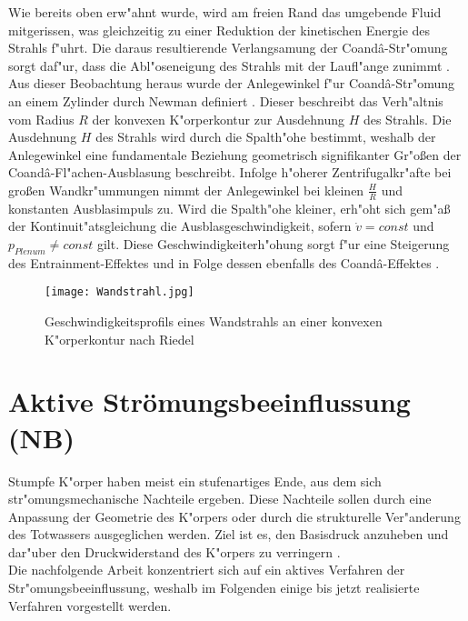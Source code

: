 Wie bereits oben erw"ahnt wurde, wird am freien Rand das umgebende Fluid mitgerissen, was gleichzeitig zu einer Reduktion der kinetischen Energie des Strahls f"uhrt. Die daraus resultierende Verlangsamung der Coand\^{a}-Str"omung sorgt daf"ur, dass die Abl"oseneigung des Strahls mit der Laufl"ange zunimmt \cite{Fischer.2011}. Aus dieser Beobachtung heraus wurde der Anlegewinkel f"ur Coand\^{a}-Str"omung an einem Zylinder durch Newman definiert \cite{Newman.1961}. Dieser beschreibt das Verh"altnis vom Radius $R$ der konvexen K"orperkontur zur Ausdehnung $H$ des Strahls. Die Ausdehnung $H$ des Strahls wird durch die Spalth"ohe bestimmt, weshalb der Anlegewinkel eine fundamentale Beziehung geometrisch signifikanter Gr"o\ss{}en der Coand\^{a}-Fl"achen-Ausblasung beschreibt. Infolge h"oherer Zentrifugalkr"afte bei gro\ss{}en Wandkr"ummungen nimmt der Anlegewinkel bei kleinen $\frac{H}{R}$ und konstanten Ausblasimpuls zu. Wird die Spalth"ohe kleiner, erh"oht sich gem"a\ss{} der Kontinuit"atsgleichung die Ausblasgeschwindigkeit, sofern $\dot v = const$ und $p_{Plenum} \neq const$ gilt. Diese Geschwindigkeiterh"ohung sorgt f"ur eine Steigerung des Entrainment-Effektes und in Folge dessen ebenfalls des Coand\^{a}-Effektes \cite{Fischer.2011}.


\begin{figure}[h]
	\centering
	\texttt{[image: Wandstrahl.jpg]}
	\caption{Geschwindigkeitsprofils eines Wandstrahls an einer konvexen K"orperkontur nach Riedel \cite{Riedel.1973}}
	\label{fig:Wandstrahl}
\end{figure}







\newpage
\section{Aktive Str\"omungsbeeinflussung (NB)}

Stumpfe K"orper haben meist ein stufenartiges Ende, aus dem sich str"omungsmechanische Nachteile ergeben. Diese Nachteile sollen durch eine Anpassung der Geometrie des K"orpers oder durch die strukturelle Ver"anderung des Totwassers ausgeglichen werden.  Ziel ist es, den Basisdruck anzuheben und dar"uber den Druckwiderstand des K"orpers zu verringern \cite{Hucho.2011}.\\
Die nachfolgende Arbeit konzentriert sich auf ein aktives Verfahren der Str"omungsbeeinflussung, weshalb im Folgenden einige bis jetzt realisierte Verfahren vorgestellt werden.

